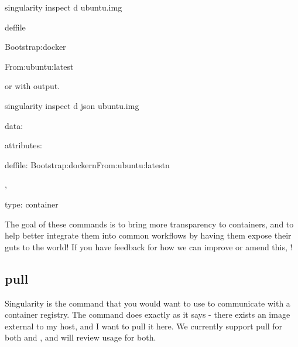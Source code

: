 \documentclass[letterpaper,10pt,english]{sphinxmanual}
\begin{document}
%
\begin{sphinxVerbatim}[commandchars=\\\{\}]
\PYGZdl{} singularity inspect \PYGZhy{}d  ubuntu.img


\PYGZsh{}\PYGZsh{}deffile

Bootstrap:docker

From:ubuntu:latest
\end{sphinxVerbatim}

or with  output.

%
\begin{sphinxVerbatim}[commandchars=\\\{\}]
\PYGZdl{} singularity inspect \PYGZhy{}d \PYGZhy{}\PYGZhy{}json ubuntu.img

\PYGZob{}

    \PYGZdq{}data\PYGZdq{}: \PYGZob{}

        \PYGZdq{}attributes\PYGZdq{}: \PYGZob{}

            \PYGZdq{}deffile\PYGZdq{}: \PYGZdq{}Bootstrap:docker\PYGZbs{}nFrom:ubuntu:latest\PYGZbs{}n\PYGZdq{}

        \PYGZcb{},

        \PYGZdq{}type\PYGZdq{}: \PYGZdq{}container\PYGZdq{}

    \PYGZcb{}

\PYGZcb{}
\end{sphinxVerbatim}

The goal of these commands is to bring more transparency to containers,
and to help better integrate them into common workflows by having them
expose their guts to the world! If you have feedback for how we can
improve or amend this, !


\subsection{pull}
\label{\detokenize{appendix:id30}}\label{\detokenize{appendix:id31}}\label{\detokenize{appendix:sec-pull}}
Singularity  is the command that you would want to use to communicate
with a container registry. The command does exactly as it says - there
exists an image external to my host, and I want to pull it here. We
currently support pull for both  and , and will review usage for both.
\end{document}
